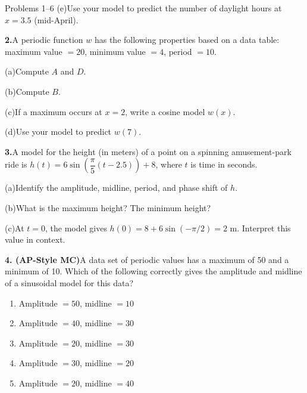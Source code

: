\documentclass[10pt]{article}
\begin{document}
\begin{notesbox}{Problems 1--6}
\vspace{4pt}
(e)\quad Use your model to predict the number of daylight hours at $x = 3.5$ (mid-April).
\writeline

\vspace{0.12in}
\textbf{2.}\quad A periodic function $w$ has the following properties based on a data table:
maximum value $= 20$, minimum value $= 4$, period $= 10$.

\vspace{4pt}
(a)\quad Compute $A$ and $D$. \writeline

\vspace{4pt}
(b)\quad Compute $B$. \writeline

\vspace{4pt}
(c)\quad If a maximum occurs at $x = 2$, write a cosine model $w(x)$.
\writeline

\vspace{4pt}
(d)\quad Use your model to predict $w(7)$. \writeline

\vspace{0.12in}
\textbf{3.}\quad A model for the height (in meters) of a point on a spinning
amusement-park ride is $h(t) = 6\sin\!\left(\dfrac{\pi}{5}(t - 2.5)\right) + 8$,
where $t$ is time in seconds.

\vspace{4pt}
(a)\quad Identify the amplitude, midline, period, and phase shift of $h$.

\vspace{4pt}
(b)\quad What is the maximum height? The minimum height?
\writeline

\vspace{4pt}
(c)\quad At $t = 0$, the model gives $h(0) = 8 + 6\sin(-\pi/2) = 2$ m.
Interpret this value in context.

\vspace{0.12in}
\textbf{4. (AP-Style MC)}\quad A data set of periodic values has a maximum of 50
and a minimum of 10. Which of the following correctly gives the amplitude and
midline of a sinusoidal model for this data?

\begin{enumerate}[label=(\Alph*), leftmargin=2em, itemsep=3pt]
  \item Amplitude $= 50$, midline $= 10$
  \item Amplitude $= 40$, midline $= 30$
  \item Amplitude $= 20$, midline $= 30$
  \item Amplitude $= 30$, midline $= 20$
  \item Amplitude $= 20$, midline $= 40$
\end{enumerate}


\end{notesbox}
\end{document}
